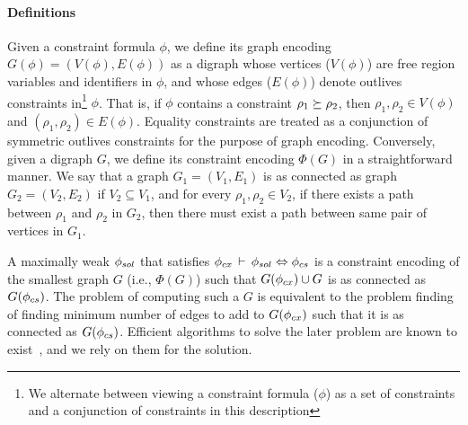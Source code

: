 \paragraph{Definitions} Given a constraint formula $\phi$, we define
its graph encoding $G(\phi)=(V(\phi),E(\phi))$ as a digraph whose
vertices ($V(\phi)$) are free region variables and identifiers in
$\phi$, and whose edges ($E(\phi)$) denote outlives constraints
in\footnote{We alternate between viewing a constraint formula ($\phi$)
as a set of constraints and a conjunction of constraints in this
description} $\phi$.  That is, if $\phi$ contains a constraint $\rho_1
\succeq \rho_2$, then $\rho_1,\rho_2 \in V(\phi)$ and
$(\rho_1,\rho_2) \in E(\phi)$. Equality constraints are treated as a
conjunction of symmetric outlives constraints for the purpose of graph
encoding. Conversely, given a digraph $G$, we define its constraint
encoding $\Phi(G)$ in a straightforward manner. We say that a graph
$G_1=(V_1,E_1)$ is as connected as graph $G_2=(V_2,E_2)$ if $V_2
\subseteq V_1$, and for every $\rho_1, \rho_2 \in V_2$, if there
exists a path between $\rho_1$ and $\rho_2$ in $G_2$, then there must
exist a path between same pair of vertices in $G_1$. 

A maximally weak $\phi_{sol}$ that satisfies $\phi_{cx}\,\vdash\,\phi_{sol}
\Leftrightarrow \phi_{cs}$ is a constraint encoding of the smallest
graph $G$ (i.e., $\Phi(G)$) such that $G(\phi_{cx}) \cup G$ is as
connected as $G(\phi_{cs})$. The problem of computing such a $G$ is
equivalent to the problem finding of finding minimum number of edges
to add to $G(\phi_{cx})$ such that it is as connected as $G(\phi_{cs})$.
Efficient algorithms to solve the later problem are known to
exist~\cite{graph}, and we rely on them for the solution.

